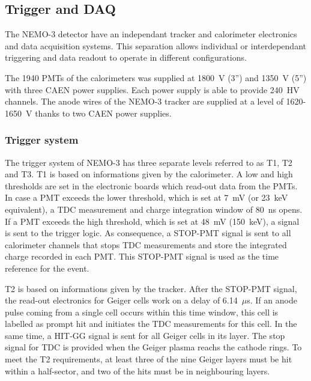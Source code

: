 \documentclass[main.tex]{subfiles}
\begin{document}
\FloatBarrier


\subsection{Trigger and DAQ}\label{sec:triggerAndDAQ}


\NI The NEMO-3 detector have an independant tracker and calorimeter electronics and data acquisition systems. This separation allows individual or interdependant triggering and data readout to operate in different configurations. 


\bigskip


\NI The 1940 PMTs of the calorimeters was supplied at 1800~V (3'') and 1350~V (5'') with three CAEN power supplies. Each power supply is able to provide 240~HV channels. The anode wires of the NEMO-3 tracker are supplied at a level of 1620-1650~V thanks to two CAEN power supplies. 


\subsubsection{Trigger system}


\NI The trigger system of NEMO-3 has three separate levels referred to as T1, T2 and T3. T1 is based on informations given by the calorimeter. A low and high thresholds are set in the electronic boards which read-out data from the PMTs. In case a PMT exceeds the lower threshold, which is set at 7~mV (or 23~keV equivalent), a TDC measurement and charge integration window of 80~ns opens. If a PMT exceeds the high threshold, which is set at 48~mV (150~keV), a signal is sent to the trigger logic. As consequence, a STOP-PMT signal is sent to all calorimeter channels that stops TDC measurements and store the integrated charge recorded in each PMT. This STOP-PMT signal is used as the time reference for the event.


\bigskip


\NI T2 is based on informations given by the tracker. After the STOP-PMT signal, the read-out electronics for Geiger cells work on a delay of 6.14~$\mu$s. If an anode pulse coming from a single cell occurs within this time window, this cell is labelled as prompt hit and initiates the TDC measurements for this cell. In the same time, a HIT-GG signal is sent for all Geiger cells in its layer. The stop signal for TDC is provided when the Geiger plasma reachs the cathode rings. To meet the T2 requirements, at least three of the nine Geiger layers must be hit within a half-sector, and two of the hits must be in neighbouring layers.
\end{document}
